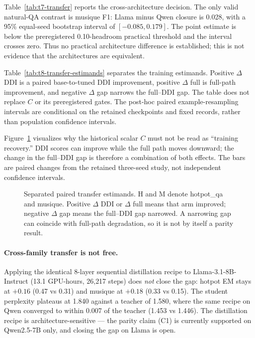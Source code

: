 Table~\ref{tab:t7-transfer} reports the cross-architecture decision. The only
valid natural-QA contrast is musique F1: Llama minus Qwen closure is 0.028,
with a 95\% equal-seed bootstrap interval of $[-0.085, 0.179]$. The point
estimate is below the preregistered 0.10-headroom practical threshold and the
interval crosses zero. Thus no practical architecture difference is
established; this is not evidence that the architectures are equivalent.

Table~\ref{tab:t8-transfer-estimands} separates the training estimands. Positive
$\Delta$ DDI is a paired base-to-tuned DDI improvement, positive $\Delta$ full
is full-path improvement, and negative $\Delta$ gap narrows the full--DDI gap.
The table does not replace $C$ or its preregistered gates. The post-hoc paired
example-resampling intervals are conditional on the retained checkpoints and
fixed records, rather than population confidence intervals.

Figure~\ref{fig:transfer-estimands} visualizes why the historical scalar $C$
must not be read as ``training recovery.'' DDI scores can improve while the
full path moves downward; the change in the full--DDI gap is therefore a
combination of both effects. The bars are paired changes from the retained
three-seed study, not independent confidence intervals.

\begin{figure}[t]
\centering
\resizebox{\linewidth}{!}{}
\caption{Separated paired transfer estimands. H and M denote hotpot\_qa and
    musique. Positive $\Delta$ DDI or $\Delta$ full means that arm improved;
    negative $\Delta$ gap means the full--DDI gap narrowed. A narrowing gap can
    coincide with full-path degradation, so it is not by itself a parity result.}
\label{fig:transfer-estimands}
\end{figure}

\begin{table}[t]
\centering\small
\caption{T7 --- matched three-seed transfer decisions. The contrast is
    Llama-3.1-8B minus Qwen2.5-7B normalized closure. ``Unavailable'' means
    that an admissibility or blind-control gate failed; no architecture
    conclusion is drawn for that cell.}
\label{tab:t7-transfer}

\end{table}

\paragraph{Cross-family transfer is not free.}
Applying the identical 8-layer sequential distillation recipe to
Llama-3.1-8B-Instruct (13.1 GPU-hours, 26{,}217 steps) does \emph{not}
close the gap: hotpot EM stays at $+0.16$ (0.47 vs 0.31) and musique at
$+0.18$ (0.33 vs 0.15). The student perplexity plateaus at 1.840 against
a teacher of 1.580, where the same recipe on Qwen converged to within
0.007 of the teacher (1.453 vs 1.446). The distillation recipe is
architecture-sensitive --- the parity claim (C1) is currently supported
on Qwen2.5-7B only, and closing the gap on Llama is open.


